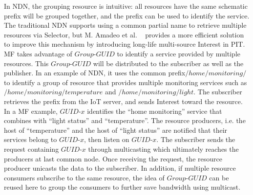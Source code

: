 In NDN, the grouping resource is intuitive: all resources have the same schematic prefix will be grouped together, and the prefix can be used to identify the service. The traditional NDN supports using a common partial name to retrieve multiple resources via Selector, but M. Amadeo et al. ~\cite{amadeo2014multi} provides a more efficient solution to improve this mechanism by introducing long-life multi-source Interest in PIT. MF takes advantage of  $Group$-$GUID$ to identify a service provided by multiple resources. This $Group$-$GUID$ will be distributed to the subscriber as well as the publisher. In an example of NDN,  it uses the common prefix$/home/monitoring/$ to identify a group of resource that provides multiple monitoring services such as $/home/monitoring/temperature$ and $/home/monitoring/light$. The subscriber retrieves the prefix from the IoT server, and sends Interest toward the resource. In a MF example, $GUID$-$x$ identifies the ``home monitoring'' service that combines with ``light status'' and ``temperature''. The resource producers, i.e. the host of ``temperature'' and the host of ``light status'' are notified that their services belong to $GUID$-$x$, then listen on $GUID$-$x$. The subscriber sends the request containing  $GUID$-$x$ through multicasting which ultimately reaches the producers at last common node. Once receiving the request, the resource producer unicasts the data to the subscriber. In addition, if multiple resource consumers subscribe to the same resource, the idea of $Group$-$GUID$ can be reused here to group the consumers to further save bandwidth using multicast.

